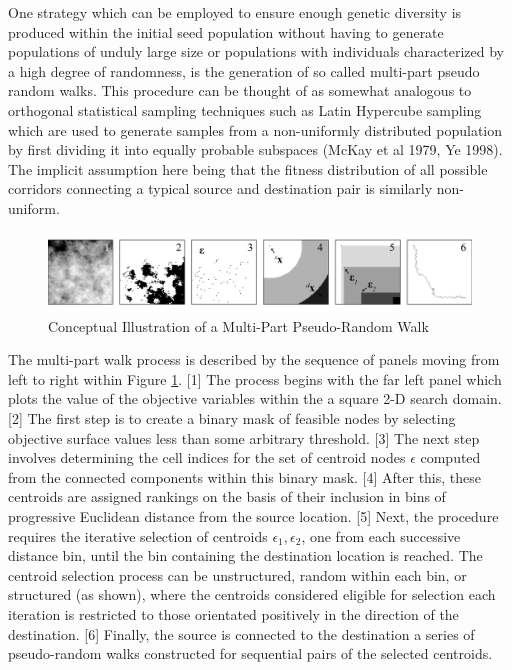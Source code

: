 One strategy which can be employed to ensure enough genetic diversity is produced within the initial seed population without having to generate populations of unduly large size or populations with individuals characterized by a high degree of randomness, is the generation of so called multi-part pseudo random walks. This procedure can be thought of as somewhat analogous to orthogonal statistical sampling techniques such as Latin Hypercube sampling which are used to generate samples from a non-uniformly distributed population by first dividing it into equally probable subspaces (McKay et al 1979, Ye 1998). The implicit assumption here being that the fitness distribution of all possible corridors connecting a typical source and destination pair is similarly non-uniform.
            
            \begin{figure}[!h]
            \centering
            \includegraphics[width=5.5in]{figures/multi-part-pseudo-random-walk-example.png}
            \caption[Conceptual Illustration of a Multi-Part Pseudo-Random Walk]{Conceptual Illustration of a Multi-Part Pseudo-Random Walk}
            \label{fig:multi-part-pseudo-random-walk-example}
            \end{figure}
            
The multi-part walk process is described by the sequence of panels moving from left to right within Figure \ref{fig:multi-part-pseudo-random-walk-example}. [1] The process begins with the far left panel which plots the value of the objective variables within the a square 2-D search domain. [2] The first step is to create a binary mask of feasible nodes by selecting objective surface values less than some arbitrary threshold. [3] The next step involves determining the cell indices for the set of centroid nodes $\epsilon$ computed from the connected components within this binary mask. [4] After this, these centroids are assigned rankings on the basis of their inclusion in bins of progressive Euclidean distance from the source location. [5] Next, the procedure requires the iterative selection of centroids $\epsilon_1, \epsilon_2$, one from each successive distance bin, until the bin containing the destination location is reached. The centroid selection process can be unstructured, random within each bin, or structured (as shown), where the centroids considered eligible for selection each iteration is restricted to those orientated positively in the direction of the destination. [6] Finally, the source is connected to the destination a series of pseudo-random walks constructed for sequential pairs of the selected centroids.
            
